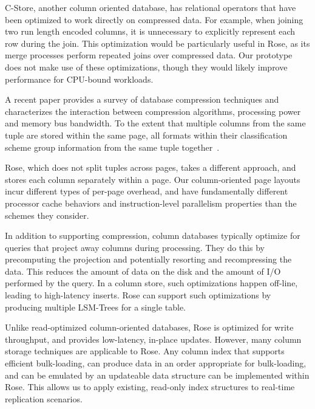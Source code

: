 \documentclass{vldb}
\newcommand{\rows}{Rose\xspace}
\begin{document}
C-Store, another column oriented database, has relational operators
that have been optimized to work directly on compressed
data\cite{compExec}.  For example, when joining two run length encoded
columns, it is unnecessary to explicitly represent each row during the
join.  This optimization would be particularly useful in \rows, as its
merge processes perform repeated joins over compressed data.  Our
prototype does not make use of these optimizations, though they would
likely improve performance for CPU-bound workloads.

A recent paper provides a survey of database compression
techniques and characterizes the interaction between compression
algorithms, processing power and memory bus bandwidth.  To the extent
that multiple columns from the same tuple are stored within the same
page, all formats within their classification scheme group information
from the same tuple together~\cite{bitsForChronos}.

\rows, which does not split tuples across pages, takes a different
approach, and stores each column separately within a page.  Our
column-oriented page layouts incur different types of per-page overhead, and
have fundamentally different processor
cache behaviors and instruction-level parallelism properties than the
schemes they consider.

In addition to supporting compression, column databases typically
optimize for queries that project away columns during processing.
They do this by precomputing the projection and potentially resorting
and recompressing the data.  This reduces the amount of data on the
disk and the amount of I/O performed by the query.  In a
column store, such optimizations happen off-line, leading to
high-latency inserts.  \rows can support such optimizations by
producing multiple LSM-Trees for a single table.

Unlike read-optimized column-oriented databases, \rows is optimized
for write throughput, and provides low-latency, in-place updates.
However, many column storage techniques are applicable to \rows.  Any
column index that supports efficient bulk-loading, can produce data in
an order appropriate for bulk-loading, and can be emulated by an
updateable data structure can be implemented within
\rows.  This allows us to apply existing, read-only index structures
to real-time replication scenarios.

\end{document}
